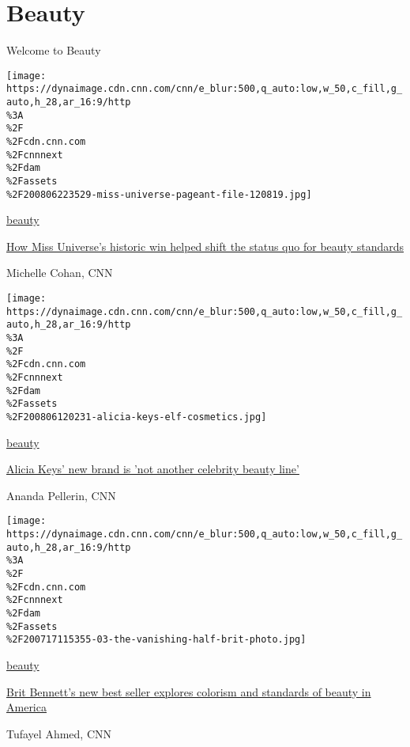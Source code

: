 \href{/}{}\href{/style}{}

\hypertarget{beauty}{%
\section{Beauty}\label{beauty}}

Welcome to Beauty

\href{/style/article/zozibini-tunzi-miss-universe-south-africa-beauty-spc-intl/index.html}{}

\texttt{[image: https://dynaimage.cdn.cnn.com/cnn/e\_blur:500,q\_auto:low,w\_50,c\_fill,g\_auto,h\_28,ar\_16:9/http\\\%3A\\\%2F\\\%2Fcdn.cnn.com\\\%2Fcnnnext\\\%2Fdam\\\%2Fassets\\\%2F200806223529-miss-universe-pageant-file-120819.jpg]}

\href{/style/beauty}{beauty}

\href{/style/article/zozibini-tunzi-miss-universe-south-africa-beauty-spc-intl/index.html}{How
Miss Universe's historic win helped shift the status quo for beauty
standards}

Michelle Cohan, CNN

\href{/style/article/alicia-keys-elf-beauty-lifestyle-skincare/index.html}{}

\texttt{[image: https://dynaimage.cdn.cnn.com/cnn/e\_blur:500,q\_auto:low,w\_50,c\_fill,g\_auto,h\_28,ar\_16:9/http\\\%3A\\\%2F\\\%2Fcdn.cnn.com\\\%2Fcnnnext\\\%2Fdam\\\%2Fassets\\\%2F200806120231-alicia-keys-elf-cosmetics.jpg]}

\href{/style/beauty}{beauty}

\href{/style/article/alicia-keys-elf-beauty-lifestyle-skincare/index.html}{Alicia
Keys' new brand is 'not another celebrity beauty line'}

Ananda Pellerin, CNN

\href{/style/article/the-vanishing-half-brit-bennett/index.html}{}

\texttt{[image: https://dynaimage.cdn.cnn.com/cnn/e\_blur:500,q\_auto:low,w\_50,c\_fill,g\_auto,h\_28,ar\_16:9/http\\\%3A\\\%2F\\\%2Fcdn.cnn.com\\\%2Fcnnnext\\\%2Fdam\\\%2Fassets\\\%2F200717115355-03-the-vanishing-half-brit-photo.jpg]}

\href{/style/beauty}{beauty}

\href{/style/article/the-vanishing-half-brit-bennett/index.html}{Brit
Bennett's new best seller explores colorism and standards of beauty in
America}

Tufayel Ahmed, CNN

\href{/style/article/indian-matchmaking-netflix-intl-hnk-beauty/index.html}{}

